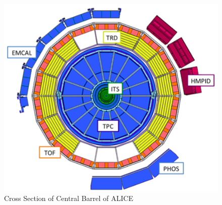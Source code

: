 \begin{figure}[t]
\centering
\includegraphics[width=1.0\textwidth]{Images/Chapter3/cross_section}
\caption[Cross Section of Central Barrel of ALICE]{Cross Section of Central Barrel of ALICE}
\label{Fig:cap3-1.3}
\end{figure}


